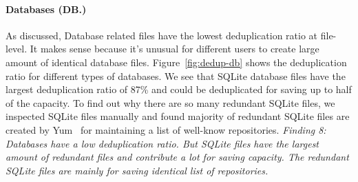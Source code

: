 \paragraph{Databases (DB.)}
%
As discussed, Database related files have the lowest deduplication ratio at file-level. It makes sense because it's unusual for different users to create large amount of identical database files. Figure~\ref{fig:dedup-db} shows the deduplication ratio for different types of databases. We see that SQLite database files have the largest deduplication ratio of 87\% and could be deduplicated for saving up to half of the capacity. To find out why there are so many redundant SQLite files, we inspected SQLite files manually and found majority of redundant SQLite files are created by Yum~\cite{xxx} for maintaining a list of well-know repositories.
%
\textit{Finding 8: Databases have a low deduplication ratio. But SQLite files have the largest amount of redundant files and contribute a lot for saving capacity. The redundant SQLite files are mainly for saving identical list of repositories.}
%
%
%
%
